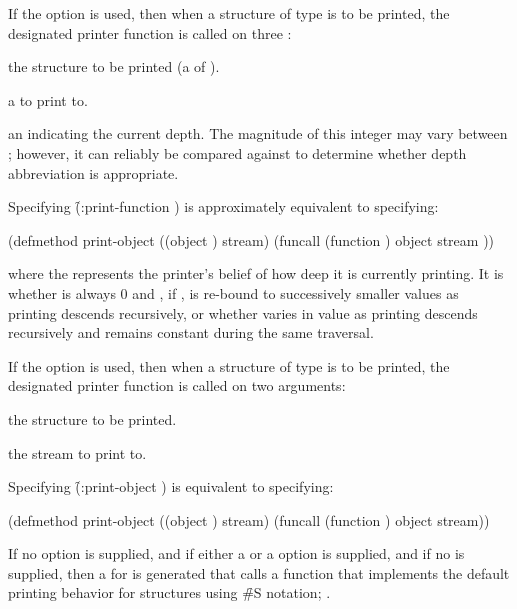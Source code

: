If the  option is used, 
then when a structure of type  is to be printed,
the designated printer function is called on three :

\beginlist 

\itemitem{--} the structure to be printed
	      (a  of ).

\itemitem{--} a  to print to.

\itemitem{--} an  indicating the current depth.
	      The magnitude of this integer may vary between ;
	      however, it can reliably be compared against 
	      to determine whether depth abbreviation is appropriate.

\endlist

Specifying \f{(:print-function )}
is approximately equivalent to specifying:

\code
 (defmethod print-object ((object ) stream)
   (funcall (function ) object stream ))
\endcode

where the  represents the printer's belief of
how deep it is currently printing.  It is 
whether  is always 0 and ,
if , is re-bound to successively smaller values as printing
descends recursively, or whether  varies in 
value as printing descends recursively and  remains
constant during the same traversal.

If the  option is used, then
when a structure of type  is to be printed,
the designated printer function is called on two arguments:

\beginlist

\itemitem{--} the structure to be printed.

\itemitem{--} the stream to print to.

\endlist

Specifying \f{(:print-object )} is equivalent to specifying:

\code
 (defmethod print-object ((object ) stream)
   (funcall (function ) object stream))
\endcode

    If no  option is supplied,
and if either a  or a  option is supplied,
and if no  is supplied,
then a    for 
is generated that calls a function that implements the default printing behavior for
structures using \f{\#S} notation; \seesection\PrintingStructures.

